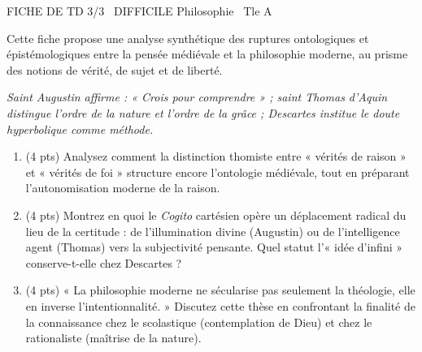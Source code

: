\documentclass[11pt]{article}
\begin{document}
\begin{tcolorbox}[enhanced,colback=popink,colframe=popink,arc=10pt,boxrule=0pt,left=12pt,right=12pt,top=9pt,bottom=9pt]
{\color{white}\popxbold\small FICHE DE TD 3/3 \textbullet\ DIFFICILE \hfill Philosophie \textbullet\ Tle A\par}
\end{tcolorbox}
\vspace{4pt}
\noindent Cette fiche propose une analyse synthétique des ruptures ontologiques et épistémologiques entre la pensée médiévale et la philosophie moderne, au prisme des notions de vérité, de sujet et de liberté.

\begin{exercice}
\emph{Saint Augustin affirme : « Crois pour comprendre » ; saint Thomas d'Aquin distingue l'ordre de la nature et l'ordre de la grâce ; Descartes institue le doute hyperbolique comme méthode.}
\begin{enumerate}
    \item (4 pts) Analysez comment la distinction thomiste entre « vérités de raison » et « vérités de foi » structure encore l'ontologie médiévale, tout en préparant l'autonomisation moderne de la raison.
    \item (4 pts) Montrez en quoi le \textit{Cogito} cartésien opère un déplacement radical du lieu de la certitude : de l'illumination divine (Augustin) ou de l'intelligence agent (Thomas) vers la subjectivité pensante. Quel statut l'« idée d'infini » conserve-t-elle chez Descartes ?
    \item (4 pts) « La philosophie moderne ne sécularise pas seulement la théologie, elle en inverse l'intentionnalité. » Discutez cette thèse en confrontant la finalité de la connaissance chez le scolastique (contemplation de Dieu) et chez le rationaliste (maîtrise de la nature).
\end{enumerate}
\end{exercice}
\end{document}

